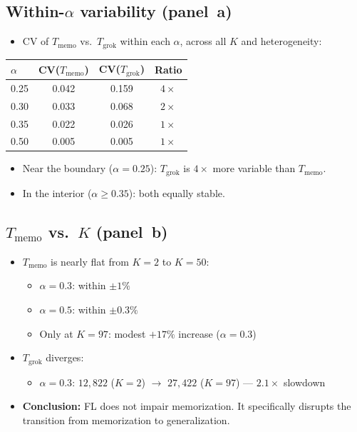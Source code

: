 \documentclass[11pt]{article}
\begin{document}
\subsection{Within-$\alpha$ variability (panel~a)}

\begin{itemize}
  \item CV of $T_{\mathrm{memo}}$ vs.\ $T_{\mathrm{grok}}$ within each
        $\alpha$, across all $K$ and heterogeneity:
\end{itemize}

\begin{center}
\begin{tabular}{lccc}
\toprule
$\alpha$ & CV($T_{\mathrm{memo}}$) & CV($T_{\mathrm{grok}}$) & Ratio \\
\midrule
0.25 & 0.042 & 0.159 & $4\times$ \\
0.30 & 0.033 & 0.068 & $2\times$ \\
0.35 & 0.022 & 0.026 & $1\times$ \\
0.50 & 0.005 & 0.005 & $1\times$ \\
\bottomrule
\end{tabular}
\end{center}

\begin{itemize}
  \item Near the boundary ($\alpha{=}0.25$): $T_{\mathrm{grok}}$ is
        $4\times$ more variable than $T_{\mathrm{memo}}$.
  \item In the interior ($\alpha \geq 0.35$): both equally stable.
\end{itemize}

\subsection{$T_{\mathrm{memo}}$ vs.\ $K$ (panel~b)}

\begin{itemize}
  \item $T_{\mathrm{memo}}$ is nearly flat from $K{=}2$ to $K{=}50$:
  \begin{itemize}
    \item $\alpha{=}0.3$: within $\pm 1\%$
    \item $\alpha{=}0.5$: within $\pm 0.3\%$
    \item Only at $K{=}97$: modest $+17\%$ increase ($\alpha{=}0.3$)
  \end{itemize}
  \item $T_{\mathrm{grok}}$ diverges:
  \begin{itemize}
    \item $\alpha{=}0.3$: $12{,}822$ ($K{=}2$) $\to$ $27{,}422$ ($K{=}97$)
          --- $2.1\times$ slowdown
  \end{itemize}
  \item \textbf{Conclusion:} FL does not impair memorization. It specifically
        disrupts the transition from memorization to generalization.
\end{itemize}
\end{document}
